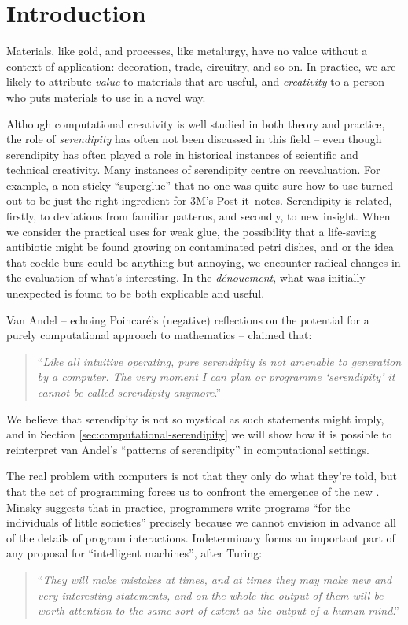 \section{Introduction}

Materials, like gold, and processes, like metalurgy, have no value
without a context of application: decoration, trade, circuitry, and so
on.  In practice, we are likely to attribute \emph{value} to materials that
are useful, and \emph{creativity} to a person who puts materials to use in a
novel way.

Although computational creativity is well studied in both theory and
practice, the role of \emph{serendipity} has often not been discussed
in this field -- even though serendipity has often played a role in
historical instances of scientific and technical creativity.  Many
instances of serendipity centre on reevaluation.  For example, a
non-sticky ``superglue'' that no one was quite sure how to use turned
out to be just the right ingredient for 3M's
Post-it\texttrademark\ notes.
%
Serendipity is related, firstly, to deviations from familiar patterns,
and secondly, to new insight.
%
When we consider the practical uses for weak glue, the possibility
that a life-saving antibiotic might be found growing on contaminated
petri dishes, and or the idea that cockle-burs could be anything but
annoying, we encounter radical changes in the evaluation of what's
interesting.  In the \emph{d\'enouement}, what was initially
unexpected is found to be both explicable and useful.

Van Andel \citeyear{van1994anatomy} -- echoing Poincar\'e's
\citeyear{poincare1910creation} (negative) reflections on the potential
for a purely computational approach to mathematics -- claimed that:
\begin{quote}
``\emph{Like all intuitive operating, pure serendipity is not amenable
    to generation by a computer.  The very moment I can plan or
    programme `serendipity' it cannot be called serendipity
    anymore}.'' \cite{van1994anatomy}
\end{quote}
We believe that serendipity is not so mystical as such statements
might imply, and in Section \ref{sec:computational-serendipity} we
will show how it is possible to reinterpret van Andel's ``patterns of
serendipity'' in computational settings.

The real problem with computers is not that they only do what they're
told, but that the act of programming forces us to confront the
emergence of the new \cite{mead1932philosophy}.
%
Minsky \citeyear{minsky1967programming} suggests that in practice,
programmers write programs ``for the individuals of little societies''
precisely because we cannot envision in advance all of the details of
program interactions.
%
Indeterminacy forms an important part of any proposal for
``intelligent machines'', after Turing:
\begin{quote}
``\emph{They will make mistakes at times, and at times they may make
    new and very interesting statements, and on the whole the output
    of them will be worth attention to the same sort of extent as the
    output of a human mind}.''  \cite{turing-intelligent}
\end{quote}

